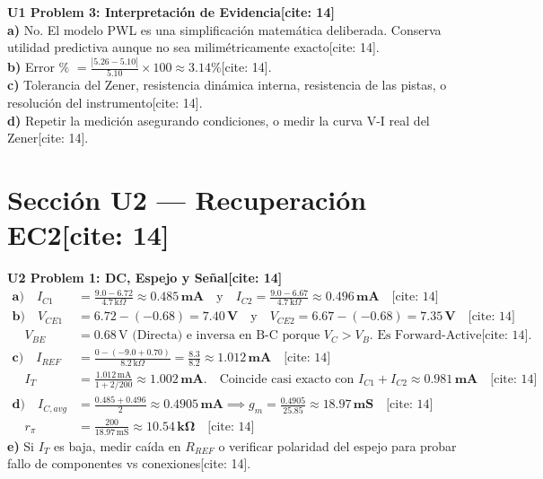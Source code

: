 \documentclass[11pt, a4paper]{article}
\begin{document}
\vspace{0.2cm}
\textbf{U1 Problem 3: Interpretación de Evidencia[cite: 14]} \\
\textbf{a)} No. El modelo PWL es una simplificación matemática deliberada. Conserva utilidad predictiva aunque no sea milimétricamente exacto[cite: 14]. \\
\textbf{b)} Error $\%$ $= \frac{|5.26 - 5.10|}{5.10} \times 100 \approx \mathbf{3.14\%}$[cite: 14]. \\
\textbf{c)} Tolerancia del Zener, resistencia dinámica interna, resistencia de las pistas, o resolución del instrumento[cite: 14]. \\
\textbf{d)} Repetir la medición asegurando condiciones, o medir la curva V-I real del Zener[cite: 14].

\section*{Sección U2 — Recuperación EC2[cite: 14]}
\textbf{U2 Problem 1: DC, Espejo y Señal[cite: 14]}
\begin{align*}
    \textbf{a)} \quad I_{C1} &= \frac{9.0 - 6.72}{4.7\,\text{k}\Omega} \approx \mathbf{0.485\,\text{mA}} \quad \text{y} \quad I_{C2} = \frac{9.0 - 6.67}{4.7\,\text{k}\Omega} \approx \mathbf{0.496\,\text{mA}} \quad \text{[cite: 14]} \\
    \textbf{b)} \quad V_{CE1} &= 6.72 - (-0.68) = \mathbf{7.40\,\text{V}} \quad \text{y} \quad V_{CE2} = 6.67 - (-0.68) = \mathbf{7.35\,\text{V}} \quad \text{[cite: 14]} \\
    \quad V_{BE} &= 0.68\,\text{V} \text{ (Directa) e inversa en B-C porque } V_C > V_B \text{. Es Forward-Active[cite: 14].} \\
    \textbf{c)} \quad I_{REF} &= \frac{0 - (-9.0 + 0.70)}{8.2\,\text{k}\Omega} = \frac{8.3}{8.2} \approx \mathbf{1.012\,\text{mA}} \quad \text{[cite: 14]} \\
    \quad I_T &= \frac{1.012\,\text{mA}}{1 + 2/200} \approx \mathbf{1.002\,\text{mA}}. \quad \text{Coincide casi exacto con } I_{C1} + I_{C2} \approx \mathbf{0.981\,\text{mA}} \quad \text{[cite: 14]} \\
    \textbf{d)} \quad I_{C,avg} &= \frac{0.485 + 0.496}{2} \approx \mathbf{0.4905\,\text{mA}} \implies g_m = \frac{0.4905}{25.85} \approx \mathbf{18.97\,\text{mS}} \quad \text{[cite: 14]} \\
    \quad r_\pi &= \frac{200}{18.97\,\text{mS}} \approx \mathbf{10.54\,\text{k}\Omega} \quad \text{[cite: 14]}
\end{align*}
\textbf{e)} Si $I_T$ es baja, medir caída en $R_{REF}$ o verificar polaridad del espejo para probar fallo de componentes vs conexiones[cite: 14].
\end{document}
